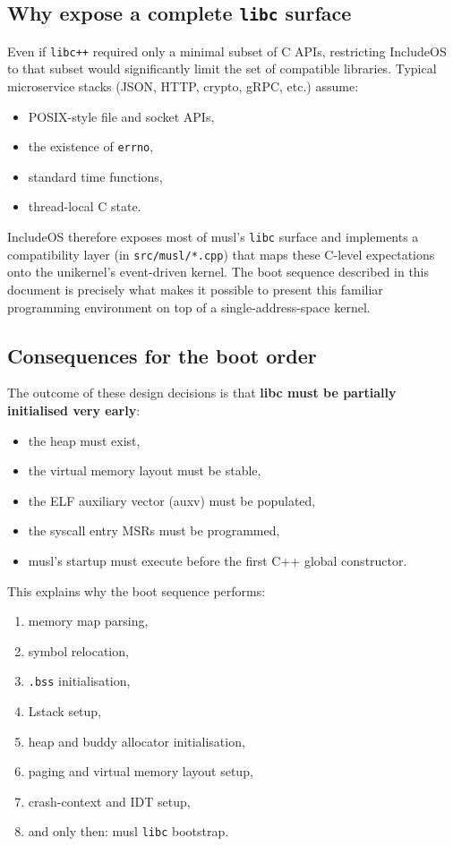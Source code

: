 \documentclass[a4paper,11pt]{article}
\begin{document}
\subsection{Why expose a complete \texttt{libc} surface}

Even if \texttt{libc++} required only a minimal subset of C APIs,
restricting IncludeOS to that subset would significantly limit the set
of compatible libraries. Typical microservice stacks (JSON, HTTP,
crypto, gRPC, etc.) assume:

\begin{itemize}
  \item POSIX-style file and socket APIs,
  \item the existence of \texttt{errno},
  \item standard time functions,
  \item thread-local C state.
\end{itemize}

IncludeOS therefore exposes most of musl’s \texttt{libc} surface and
implements a compatibility layer (in \texttt{src/musl/*.cpp}) that maps
these C-level expectations onto the unikernel’s event-driven kernel. The
boot sequence described in this document is precisely what makes it
possible to present this familiar programming environment on top of a
single-address-space kernel.

\subsection{Consequences for the boot order}

The outcome of these design decisions is that \textbf{libc must be
partially initialised very early}:

\begin{itemize}
  \item the heap must exist,
  \item the virtual memory layout must be stable,
  \item the ELF auxiliary vector (auxv) must be populated,
  \item the syscall entry MSRs must be programmed,
  \item musl’s startup must execute before the first C++ global
        constructor.
\end{itemize}

This explains why the boot sequence performs:

\begin{enumerate}
  \item memory map parsing,
  \item symbol relocation,
  \item \texttt{.bss} initialisation,
  \item Lstack setup,
  \item heap and buddy allocator initialisation,
  \item paging and virtual memory layout setup,
  \item crash-context and IDT setup,
  \item and only then: musl \texttt{libc} bootstrap.
\end{enumerate}
\end{document}
